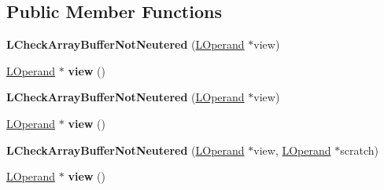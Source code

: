 \subsection*{Public Member Functions}
\begin{DoxyCompactItemize}
\item 
{\bfseries L\+Check\+Array\+Buffer\+Not\+Neutered} (\hyperlink{classv8_1_1internal_1_1_l_operand}{L\+Operand} $\ast$view)\hypertarget{classv8_1_1internal_1_1_l_check_array_buffer_not_neutered_addcdc3d86f712547d0a60295021d30d8}{}\label{classv8_1_1internal_1_1_l_check_array_buffer_not_neutered_addcdc3d86f712547d0a60295021d30d8}

\item 
\hyperlink{classv8_1_1internal_1_1_l_operand}{L\+Operand} $\ast$ {\bfseries view} ()\hypertarget{classv8_1_1internal_1_1_l_check_array_buffer_not_neutered_a63ed2c0c10f578779102ed69f6ab5765}{}\label{classv8_1_1internal_1_1_l_check_array_buffer_not_neutered_a63ed2c0c10f578779102ed69f6ab5765}

\item 
{\bfseries L\+Check\+Array\+Buffer\+Not\+Neutered} (\hyperlink{classv8_1_1internal_1_1_l_operand}{L\+Operand} $\ast$view)\hypertarget{classv8_1_1internal_1_1_l_check_array_buffer_not_neutered_addcdc3d86f712547d0a60295021d30d8}{}\label{classv8_1_1internal_1_1_l_check_array_buffer_not_neutered_addcdc3d86f712547d0a60295021d30d8}

\item 
\hyperlink{classv8_1_1internal_1_1_l_operand}{L\+Operand} $\ast$ {\bfseries view} ()\hypertarget{classv8_1_1internal_1_1_l_check_array_buffer_not_neutered_a63ed2c0c10f578779102ed69f6ab5765}{}\label{classv8_1_1internal_1_1_l_check_array_buffer_not_neutered_a63ed2c0c10f578779102ed69f6ab5765}

\item 
{\bfseries L\+Check\+Array\+Buffer\+Not\+Neutered} (\hyperlink{classv8_1_1internal_1_1_l_operand}{L\+Operand} $\ast$view, \hyperlink{classv8_1_1internal_1_1_l_operand}{L\+Operand} $\ast$scratch)\hypertarget{classv8_1_1internal_1_1_l_check_array_buffer_not_neutered_a24b5548a92c5cdf4029ad5bfc565f992}{}\label{classv8_1_1internal_1_1_l_check_array_buffer_not_neutered_a24b5548a92c5cdf4029ad5bfc565f992}

\item 
\hyperlink{classv8_1_1internal_1_1_l_operand}{L\+Operand} $\ast$ {\bfseries view} ()\hypertarget{classv8_1_1internal_1_1_l_check_array_buffer_not_neutered_a63ed2c0c10f578779102ed69f6ab5765}{}\label{classv8_1_1internal_1_1_l_check_array_buffer_not_neutered_a63ed2c0c10f578779102ed69f6ab5765}


\end{DoxyCompactItemize}
